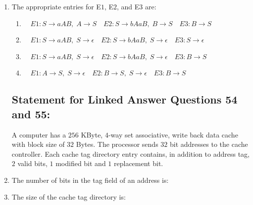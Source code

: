 \documentclass[journal]{IEEEtran}
\numberwithin{equation}{enumi}
\numberwithin{figure}{enumi}
\begin{document}
\begin{enumerate}
\item The appropriate entries for E$1$, E$2$, and E$3$ are:
\begin{enumerate}
\item $\quad E1: S \to aAB,\; A \to S \quad
E2: S \to bAaB,\; B \to S \quad
E3: B \to S$
\item $\quad E1: S \to aAB,\; S \to \epsilon \quad
E2: S \to bAaB,\; S \to \epsilon \quad
E3: S \to \epsilon$
\item $\quad E1: S \to aAB,\; S \to \epsilon \quad
E2: S \to bAaB,\; S \to \epsilon \quad
E3: B \to S$
\item $\quad E1: A \to S,\; S \to \epsilon \quad
E2: B \to S,\; S \to \epsilon \quad
E3: B \to S$
\end{enumerate}


\subsection*{Statement for Linked Answer Questions 54 and 55:}

A computer has a $256$ KByte, $4$-way set associative, write back data cache with block size of $32$ Bytes. The processor sends $32$ bit addresses to the cache controller. Each cache tag directory entry contains, in addition to address tag, $2$ valid bits, $1$ modified bit and $1$ replacement bit.

\item The number of bits in the tag field of an address is:
\begin{enumerate}
\end{enumerate}

\item The size of the cache tag directory is:
\begin{enumerate}
\end{enumerate}


\end{enumerate}
\end{document}
